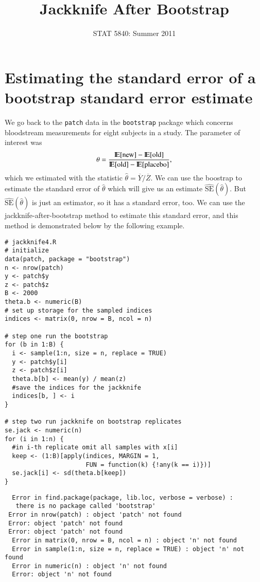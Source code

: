 \documentclass[11pt,english]{article}
\title{Jackknife After Bootstrap}
\date{STAT 5840: Summer 2011}
\begin{document}
\maketitle

\thispagestyle{empty}

\section*{Estimating the standard error of a bootstrap standard error estimate}
\label{sec-1}

We go back to the \texttt{patch} data in the \texttt{bootstrap} package which concerns bloodstream measurements for eight subjects in a study. The parameter of interest was
\[
\theta = \frac{\mathrm{I\hspace{-1.5pt}E}[\mathrm{new}] - \mathrm{I\hspace{-1.5pt}E}[\mathrm{old}]}{\mathrm{I\hspace{-1.5pt}E}[\mathrm{old}] - \mathrm{I\hspace{-1.5pt}E}[\mathrm{placebo}]},
\]
which we estimated with the statistic \(\hat{\theta} = \overline{Y}/\overline{Z}\).  We can use the boostrap to estimate the standard error of $\hat{\theta}$ which will give us an estimate $\widehat{\mathrm{SE}}(\hat{\theta})$.  But $\widehat{\mathrm{SE}}(\hat{\theta})$ is just an estimator, so it has a standard error, too.  We can use the jackknife-after-bootstrap method to estimate this standard error, and this method is demonstrated below by the following example.


\begin{verbatim}
# jackknife4.R
# initialize
data(patch, package = "bootstrap")
n <- nrow(patch)
y <- patch$y
z <- patch$z
B <- 2000
theta.b <- numeric(B)
# set up storage for the sampled indices
indices <- matrix(0, nrow = B, ncol = n)

# step one run the bootstrap
for (b in 1:B) {
  i <- sample(1:n, size = n, replace = TRUE)
  y <- patch$y[i]
  z <- patch$z[i]
  theta.b[b] <- mean(y) / mean(z)
  #save the indices for the jackknife
  indices[b, ] <- i
}

# step two run jackknife on bootstrap replicates
se.jack <- numeric(n)
for (i in 1:n) {
  #in i-th replicate omit all samples with x[i]
  keep <- (1:B)[apply(indices, MARGIN = 1,
                      FUN = function(k) {!any(k == i)})]
  se.jack[i] <- sd(theta.b[keep])
}
\end{verbatim}




\begin{verbatim}
  Error in find.package(package, lib.loc, verbose = verbose) : 
   there is no package called 'bootstrap'
 Error in nrow(patch) : object 'patch' not found
 Error: object 'patch' not found
 Error: object 'patch' not found
  Error in matrix(0, nrow = B, ncol = n) : object 'n' not found
  Error in sample(1:n, size = n, replace = TRUE) : object 'n' not found
  Error in numeric(n) : object 'n' not found
  Error: object 'n' not found
\end{verbatim}
\end{document}
